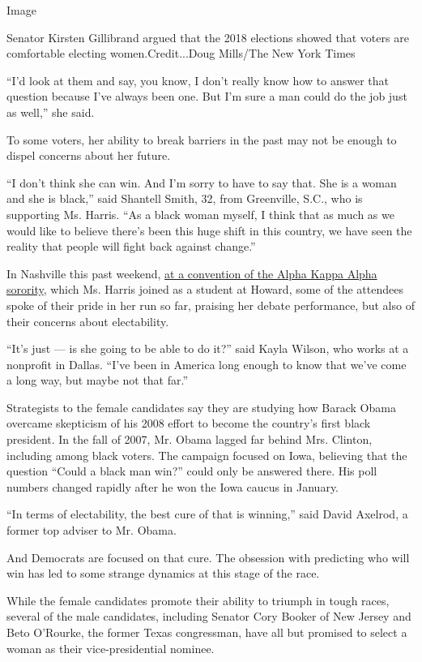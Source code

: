 Image

Senator Kirsten Gillibrand argued that the 2018 elections showed that
voters are comfortable electing women.Credit...Doug Mills/The New York
Times

``I'd look at them and say, you know, I don't really know how to answer
that question because I've always been one. But I'm sure a man could do
the job just as well,'' she said.

To some voters, her ability to break barriers in the past may not be
enough to dispel concerns about her future.

``I don't think she can win. And I'm sorry to have to say that. She is a
woman and she is black,'' said Shantell Smith, 32, from Greenville,
S.C., who is supporting Ms. Harris. ``As a black woman myself, I think
that as much as we would like to believe there's been this huge shift in
this country, we have seen the reality that people will fight back
against change.''

In Nashville this past weekend,
\href{https://www.nytimes3xbfgragh.onion/2019/07/01/us/politics/kamala-harris-alpha-kappa-alpha.html}{at
a convention of the Alpha Kappa Alpha sorority}, which Ms. Harris joined
as a student at Howard, some of the attendees spoke of their pride in
her run so far, praising her debate performance, but also of their
concerns about electability.

``It's just --- is she going to be able to do it?'' said Kayla Wilson,
who works at a nonprofit in Dallas. ``I've been in America long enough
to know that we've come a long way, but maybe not that far.''

Strategists to the female candidates say they are studying how Barack
Obama overcame skepticism of his 2008 effort to become the country's
first black president. In the fall of 2007, Mr. Obama lagged far behind
Mrs. Clinton, including among black voters. The campaign focused on
Iowa, believing that the question ``Could a black man win?'' could only
be answered there. His poll numbers changed rapidly after he won the
Iowa caucus in January.

``In terms of electability, the best cure of that is winning,'' said
David Axelrod, a former top adviser to Mr. Obama.

And Democrats are focused on that cure. The obsession with predicting
who will win has led to some strange dynamics at this stage of the race.

While the female candidates promote their ability to triumph in tough
races, several of the male candidates, including Senator Cory Booker of
New Jersey and Beto O'Rourke, the former Texas congressman, have all but
promised to select a woman as their vice-presidential nominee.

